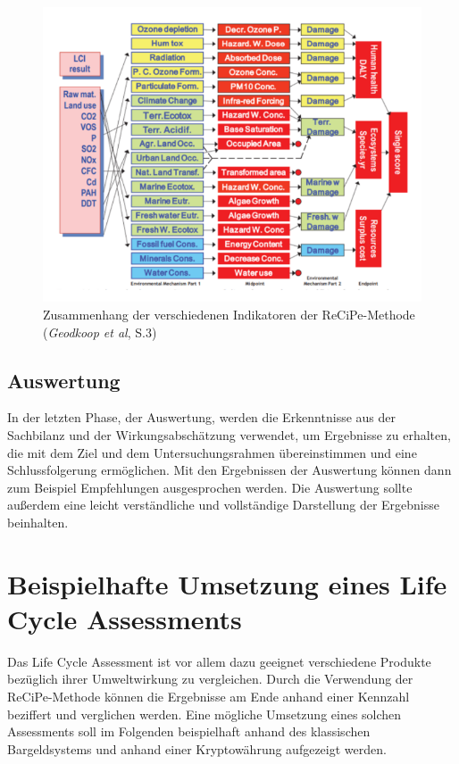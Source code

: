 \documentclass[12pt]{article}
\begin{document}
\begin{figure}[ht!]
    \centering
    \includegraphics[width=.75\textwidth]{quellen/recipe.png}
    \caption[Zusammenhang der verschiedenen Indikatoren der ReCiPe-Methode]{Zusammenhang der verschiedenen Indikatoren der ReCiPe-Methode (\textit{Geodkoop et al}, S.3)}
\end{figure}
\FloatBarrier

\subsection{Auswertung}
In der letzten Phase, der Auswertung, werden die Erkenntnisse aus der Sachbilanz und der Wirkungsabschätzung verwendet, um Ergebnisse zu erhalten, die mit dem Ziel und dem Untersuchungsrahmen übereinstimmen und eine Schlussfolgerung ermöglichen. Mit den Ergebnissen der Auswertung können dann zum Beispiel Empfehlungen ausgesprochen werden. Die Auswertung sollte außerdem eine leicht verständliche und vollständige Darstellung der Ergebnisse beinhalten.

\section{Beispielhafte Umsetzung eines Life Cycle Assessments}
Das Life Cycle Assessment ist vor allem dazu geeignet verschiedene Produkte bezüglich ihrer Umweltwirkung zu vergleichen. Durch die Verwendung der ReCiPe-Methode können die Ergebnisse am Ende anhand einer Kennzahl beziffert und verglichen werden. Eine mögliche Umsetzung eines solchen Assessments soll im Folgenden beispielhaft anhand des klassischen Bargeldsystems und anhand einer Kryptowährung aufgezeigt werden.
\end{document}
